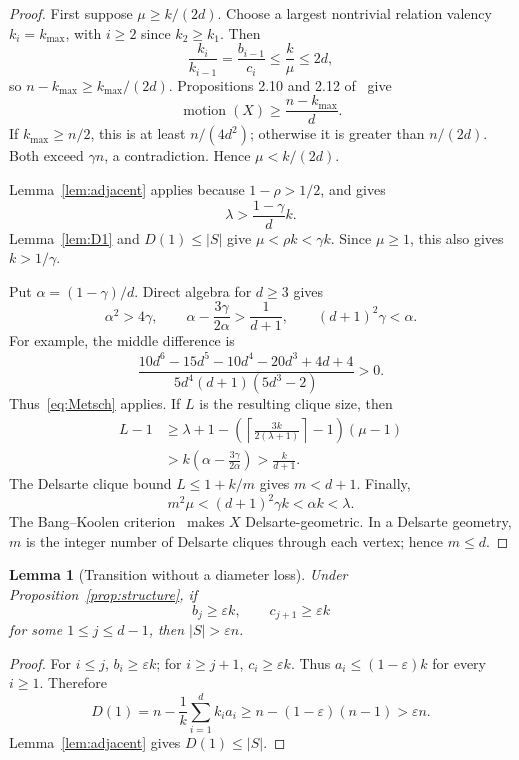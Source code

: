 \documentclass[11pt]{amsart}
\newtheorem{lemma}[theorem]{Lemma}
\theoremstyle{definition}
\newcommand{\mot}{\operatorname{motion}}
\newcommand{\eps}{\varepsilon}
\newcommand{\gam}{\gamma}
\begin{document}
\begin{proof}
First suppose $\mu\ge k/(2d)$.  Choose a largest nontrivial relation valency $k_i=k_{\max}$, with $i\ge2$ since $k_2\ge k_1$.  Then
\[
 \frac{k_i}{k_{i-1}}=\frac{b_{i-1}}{c_i}\le\frac{k}{\mu}\le2d,
\]
so $n-k_{\max}\ge k_{\max}/(2d)$.  Propositions 2.10 and 2.12 of~\cite{PS} give
\[
 \mot(X)\ge\frac{n-k_{\max}}d.
\]
If $k_{\max}\ge n/2$, this is at least $n/(4d^2)$; otherwise it is greater than $n/(2d)$.  Both exceed $\gam n$, a contradiction.  Hence $\mu<k/(2d)$.

Lemma~\ref{lem:adjacent} applies because $1-\rho>1/2$, and gives
\[
 \lambda>\frac{1-\gam}{d}k.
\]
Lemma~\ref{lem:D1} and $D(1)\le|S|$ give $\mu<\rho k<\gam k$.  Since $\mu\ge1$, this also gives $k>1/\gam$.

Put $\alpha=(1-\gam)/d$.  Direct algebra for $d\ge3$ gives
\begin{equation}\label{eq:structuralinequalities}
 \alpha^2>4\gam,
 \qquad
 \alpha-\frac{3\gam}{2\alpha}>\frac1{d+1},
 \qquad
 (d+1)^2\gam<\alpha.
\end{equation}
For example, the middle difference is
\[
 \frac{10d^6-15d^5-10d^4-20d^3+4d+4}
 {5d^4(d+1)(5d^3-2)}>0.
\]
Thus~\eqref{eq:Metsch} applies.  If $L$ is the resulting clique size, then
\begin{align*}
 L-1
 &\ge \lambda+1-
 \left(\left\lceil\frac{3k}{2(\lambda+1)}\right\rceil-1\right)(\mu-1)\\
 &>k\left(\alpha-\frac{3\gam}{2\alpha}\right)
 >\frac{k}{d+1}.
\end{align*}
The Delsarte clique bound $L\le1+k/m$ gives $m<d+1$.  Finally,
\[
 m^2\mu<(d+1)^2\gam k<\alpha k<\lambda.
\]
The Bang--Koolen criterion~\cite[Proposition 2.5]{PS} makes $X$ Delsarte-geometric.  In a Delsarte geometry, $m$ is the integer number of Delsarte cliques through each vertex; hence $m\le d$.
\end{proof}

\begin{lemma}[Transition without a diameter loss]\label{lem:transition}
Under Proposition~\ref{prop:structure}, if
\[
 b_j\ge\eps k,\qquad c_{j+1}\ge\eps k
\]
for some $1\le j\le d-1$, then $|S|>\eps n$.
\end{lemma}

\begin{proof}
For $i\le j$, $b_i\ge\eps k$; for $i\ge j+1$, $c_i\ge\eps k$.  Thus $a_i\le(1-\eps)k$ for every $i\ge1$.  Therefore
\[
 D(1)=n-\frac1k\sum_{i=1}^{d}k_i a_i
 \ge n-(1-\eps)(n-1)>\eps n.
\]
Lemma~\ref{lem:adjacent} gives $D(1)\le|S|$.
\end{proof}
\end{document}
